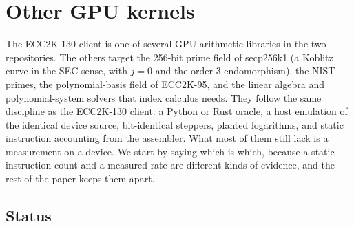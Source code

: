 \section{Other GPU kernels}
\label{sec:othergpu}

The ECC2K-130 client is one of several GPU arithmetic libraries in
the two repositories. The others target the 256-bit prime field of
secp256k1 (a Koblitz curve in the SEC sense, with $j=0$ and the
order-3 endomorphism), the NIST primes, the polynomial-basis field of
ECC2K-95, and the linear algebra and polynomial-system solvers that
index calculus needs. They follow the same discipline as the
ECC2K-130 client: a Python or Rust oracle, a host emulation of the
identical device source, bit-identical steppers, planted logarithms,
and static instruction accounting from the assembler. What most of
them still lack is a measurement on a device. We start by saying
which is which, because a static instruction count and a measured
rate are different kinds of evidence, and the rest of the paper keeps
them apart.

\subsection{Status}
\label{sec:othergpu-status}

